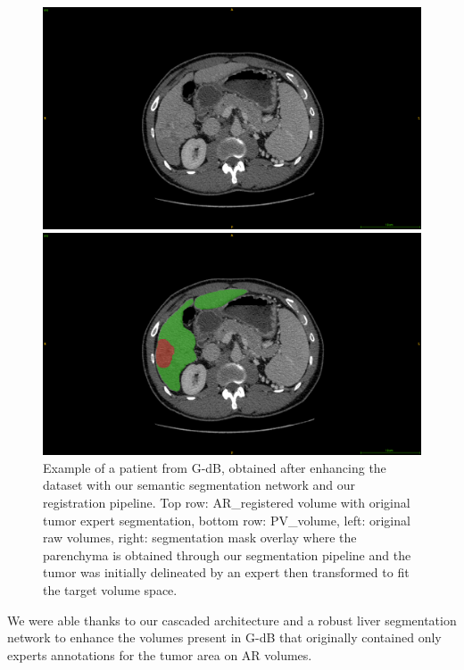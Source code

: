 \documentclass[]{article}
\newcommand{\lmttfont}[1]{{\fontfamily{lmtt}\selectfont #1}}
\begin{document}
\begin{figure}[ht!]
\vspace{0.8cm}
\begin{minipage}{0.45\linewidth}
\includegraphics[width=0.9\linewidth]{./images/GDB/GDB_Pat77_slice261_raw_PV}
\end{minipage}
\hspace{0.3cm}
\begin{minipage}{0.45\linewidth}
\includegraphics[width=0.9\linewidth]{./images/GDB/GDB_Pat77_slice261_PV_liverTumorPred}
\end{minipage}
\caption{Example of a patient from \lmttfont{G-dB}, obtained after enhancing the dataset with our semantic segmentation network and our registration pipeline. Top row: AR\_registered volume with original tumor expert segmentation, bottom row: PV\_volume, left: original raw volumes, right: segmentation mask overlay where the parenchyma is obtained through our segmentation pipeline and the tumor was initially delineated by an expert then transformed to fit the target volume space.}
\label{fig:gDbRegisteredPatient}
\end{figure}


We were able thanks to our cascaded architecture and a robust liver
segmentation network to enhance the volumes present in \lmttfont{G-dB} that
originally contained only experts annotations for the tumor area on AR volumes.
\end{document}
